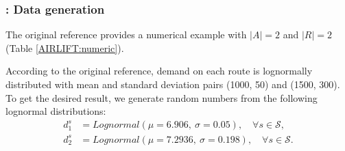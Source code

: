 \subsubsection{\airlift: Data generation}
The original reference \cite{journal:MW1969} provides a numerical example with $|A|=2$ and $|R|=2$ (Table \ref{AIRLIFT:numeric}). 

\begin{table}[H]
	\caption{\airlift: Numerical data in \cite{journal:MW1969}}
	\label{AIRLIFT:numeric}
	\centering
\end{table}
According to the original reference, demand on each route is lognormally distributed with mean and standard deviation pairs (1000, 50) and (1500, 300). To get the desired result, we generate random numbers from the following lognormal distributions:
\begin{align*}
d_1^s&=Lognormal(\mu=6.906,\ \sigma=0.05),\quad\forall s\in\mathcal{S},\\
d_2^s&=Lognormal(\mu=7.2936,\ \sigma=0.198),\quad\forall s\in\mathcal{S}.
\end{align*}

